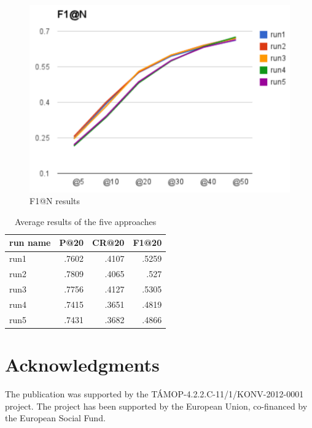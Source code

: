 \documentclass{acm_proc_article-me}
\begin{document}
\begin{figure}[h]
\centering
\includegraphics[width=0.95\linewidth]{f1}
\caption{F1@N results}
\label{fig:p}
\end{figure}


\begin{table}[h]
\centering
\begin{tabular}{|l|r|r|r|}
	\hline 
	run name & P@20 & CR@20 & F1@20\tabularnewline
	\hline 
	\hline 
	run1 & .7602 & .4107 & .5259\tabularnewline
	\hline 
	run2 & .7809 & .4065 & .527\tabularnewline
	\hline 
	run3 & .7756 & .4127 & .5305\tabularnewline
	\hline 
	run4 & .7415 & .3651 & .4819\tabularnewline
	\hline 
	run5 & .7431 & .3682 & .4866\tabularnewline
	\hline 
\end{tabular}
\caption{Average results of the five approaches}
\label{table:results}
\end{table}




\section{Acknowledgments}

The publication was supported by the T\'AMOP-4.2.2.C-11/1/KONV-2012-0001 project. The project has been supported by the European Union, co-financed by the European Social Fund.



\end{document}
